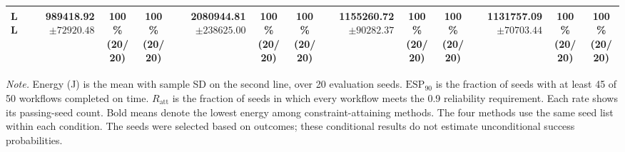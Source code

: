 \begin{table}[!t]
\begin{tabular}{@{}l*{4}{rcc}@{}}
LL & \shortstack[r]{\textbf{989418.92}\\$\pm 72920.48$} & \shortstack[c]{100\%\\(20/20)} & \shortstack[c]{100\%\\(20/20)} & \shortstack[r]{2080944.81\\$\pm 238625.00$} & \shortstack[c]{100\%\\(20/20)} & \shortstack[c]{100\%\\(20/20)} & \shortstack[r]{1155260.72\\$\pm 90282.37$} & \shortstack[c]{100\%\\(20/20)} & \shortstack[c]{100\%\\(20/20)} & \shortstack[r]{1131757.09\\$\pm 70703.44$} & \shortstack[c]{100\%\\(20/20)} & \shortstack[c]{100\%\\(20/20)} \\
\bottomrule
\end{tabular}
\par\vspace{3pt}
\parbox{\textwidth}{\footnotesize
\textit{Note.} Energy (J) is the mean with sample SD on the second line, over 20 evaluation seeds.
$\mathrm{ESP}_{90}$ is the fraction of seeds with at least 45 of 50 workflows completed on time.
$R_{\mathrm{att}}$ is the fraction of seeds in which every workflow meets the 0.9 reliability requirement.
Each rate shows its passing-seed count. Bold means denote the lowest energy among constraint-attaining methods.
The four methods use the same seed list within each condition.
The seeds were selected based on outcomes; these conditional results do not estimate unconditional success probabilities.}
\endgroup
\end{table}

